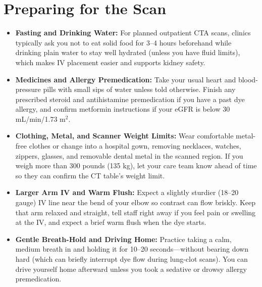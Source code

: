 \section{Preparing for the Scan}
\begin{itemize}
    \item \textbf{Fasting and Drinking Water:} For planned outpatient CTA scans, clinics typically ask you not to eat solid food for 3--4 hours beforehand while drinking plain water to stay well hydrated (unless you have fluid limits), which makes IV placement easier and supports kidney safety.
    \item \textbf{Medicines and Allergy Premedication:} Take your usual heart and blood-pressure pills with small sips of water unless told otherwise. Finish any prescribed steroid and antihistamine premedication if you have a past dye allergy, and confirm metformin instructions if your eGFR is below 30 mL/min/1.73 m$^2$.
    \item \textbf{Clothing, Metal, and Scanner Weight Limits:} Wear comfortable metal-free clothes or change into a hospital gown, removing necklaces, watches, zippers, glasses, and removable dental metal in the scanned region. If you weigh more than 300 pounds (135 kg), let your care team know ahead of time so they can confirm the CT table's weight limit.
    \item \textbf{Larger Arm IV and Warm Flush:} Expect a slightly sturdier (18--20 gauge) IV line near the bend of your elbow so contrast can flow briskly. Keep that arm relaxed and straight, tell staff right away if you feel pain or swelling at the IV, and expect a brief warm flush when the dye starts.
    \item \textbf{Gentle Breath-Hold and Driving Home:} Practice taking a calm, medium breath in and holding it for 10--20 seconds---without bearing down hard (which can briefly interrupt dye flow during lung-clot scans). You can drive yourself home afterward unless you took a sedative or drowsy allergy premedication.
\end{itemize}

